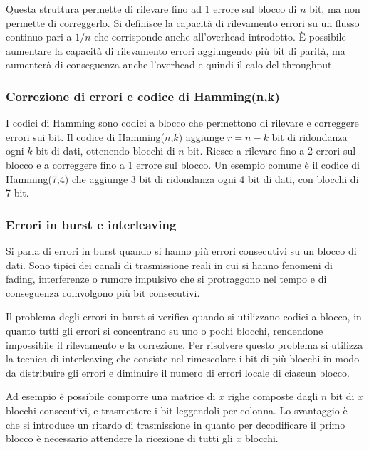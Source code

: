 Questa struttura permette di rilevare fino ad 1 errore sul blocco di \(n\) bit, ma non permette di correggerlo. Si definisce
la capacità di rilevamento errori su un flusso continuo pari a  \(1/n\) che corrisponde anche all'overhead introdotto.
È possibile aumentare la capacità di rilevamento errori aggiungendo più bit di parità, ma aumenterà di conseguenza anche
l'overhead e quindi il calo del throughput.

\subsubsection*{Correzione di errori e codice di Hamming(n,k)}
I codici di Hamming sono codici a blocco che permettono di rilevare e correggere errori sui bit. Il codice di Hamming(\(n\),\(k\))
aggiunge \(r = n - k\) bit di ridondanza ogni \(k\) bit di dati, ottenendo blocchi di \(n\) bit. Riesce a rilevare fino a
2 errori sul blocco e a correggere fino a 1 errore sul blocco. Un esempio comune è il codice di Hamming(7,4) che aggiunge
3 bit di ridondanza ogni 4 bit di dati, con blocchi di 7 bit.

\subsubsection*{Errori in burst e interleaving}
Si parla di errori in burst quando si hanno più errori consecutivi su un blocco di dati. Sono tipici dei canali di
trasmissione reali in cui si hanno fenomeni di fading, interferenze o rumore impulsivo che si protraggono nel tempo
e di conseguenza coinvolgono più bit consecutivi.

Il problema degli errori in burst si verifica quando si utilizzano codici a blocco, in quanto tutti gli errori si concentrano
su uno o pochi blocchi, rendendone impossibile il rilevamento e la correzione. Per risolvere questo problema si utilizza la
tecnica di interleaving che consiste nel rimescolare i bit di più blocchi in modo da distribuire gli errori e diminuire il
numero di errori locale di ciascun blocco.

Ad esempio è possibile comporre una matrice di \(x\) righe composte dagli \(n\) bit di \(x\) blocchi consecutivi, e
trasmettere i bit leggendoli per colonna. Lo svantaggio è che si introduce un ritardo di trasmissione in quanto per
decodificare il primo blocco è necessario attendere la ricezione di tutti gli \(x\) blocchi.

